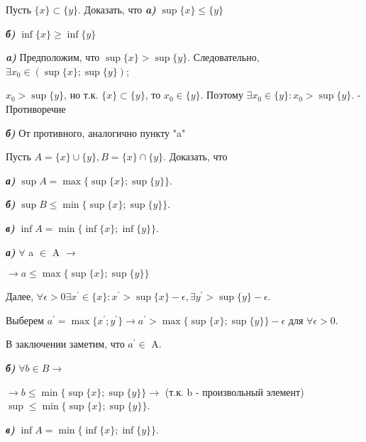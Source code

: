 \documentclass[10pt]{article}
\begin{document}
\begin{problem}

Пусть $\{x\} \subset \{y\}$. Доказать, что \emph{\textbf{a)}}  $\sup\{x\} \leq\{y\}$

\medskip

\emph{\textbf{б)}} $\inf\{x\} \geq \inf\{y\}$


\end{problem}
\begin{solution}
\emph{\textbf{a)}} Предположим, что $\sup\{x\}>\sup\{y\}$. Следовательно, $\exists x_0 \in (\sup\{x\};\sup\{y\})$;

$x_0>\sup\{y\}$, но т.к. $\{x\} \subset \{y\}$, то $x_0 \in \{y\}$. Поэтому $\exists x_0 \in \{y\}: x_0>\sup\{y\}.$ - Противоречие

\medskip

\emph{\textbf{б)}}
От противного, аналогично пункту "a"
\end{solution}


\begin{problem}

Пусть $A=\{x\}\cup\{y\}, B=\{x\}\cap\{y\}$. Доказать, что

\medskip

\emph{\textbf{а)}} $\sup{A} = \max \{\sup\{x\};\sup\{y\}\}$.

\medskip

\emph{\textbf{б)}} $\sup{B} \leq \min \{\sup\{x\};\sup\{y\}\}$.

\medskip

\emph{\textbf{в)}} $\inf{A} = \min \{\inf\{x\};\inf\{y\}\}$.

\end{problem}

\begin{solution}
\emph{\textbf{а)}} $\forall$ a $\in$ A $\rightarrow$ %

$\rightarrow a \leq\max \{\sup\{x\};\sup\{y\}\}$

\medskip

Далее, $\forall \epsilon >0 \exists x^{'}  \in \{x\} : x^{'}> \sup \{x\} - \epsilon , \exists y^{'} >\sup\{y\} - \epsilon $.

Выберем $a^{'}=\max \{x^{'};y^{'}\} \rightarrow a^{'} > \max \{\sup\{x\};\sup\{y\}\} - \epsilon $ для $ \forall \epsilon>0 $.

В заключении заметим, что $a^{'}\in$ A.

\medskip

\emph{\textbf{б)}} $\forall b \in B \rightarrow$ %

$\rightarrow b \leq \min \{\sup\{x\};\sup\{y\}\} \rightarrow$ (т.к. b - произвольный элемент) $\sup \leq\min \{\sup\{x\};\sup\{y\}\}$.

\medskip

\emph{\textbf{в)}} $\inf A = \min \{\inf\{x\};\inf\{y\}\}$.

\end{solution}
\end{document}
